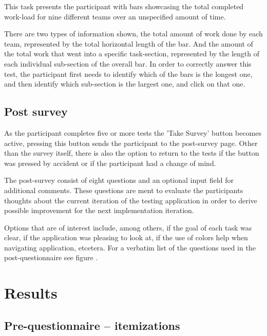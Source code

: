 \documentclass[nofilelist,dvipsnames]{cslthse-msc}
\begin{document}
{        This task presents the participant with bars showcasing the total
        completed work-load for nine different teams over an unspecified amount
        of time.

        There are two types of information shown, the total amount of work done
        by each team, represented by the total horizontal length of the bar.
        And the amount of the total work that went into a specific
        task-section, represented by the length of each individual sub-section
        of the overall bar.
        In order to correctly answer this test, the participant first needs to
        identify which of the bars is the longest one, and then identify which
        sub-section is the largest one, and click on that one.

      \subsection{Post survey}

        As the participant completes five or more tests the 'Take Survey'
        button becomes active, pressing this button sends the participant to
        the post-survey page. Other than the survey itself, there is also the
        option to return to the tests if the button was pressed by accident or
        if the participant had a change of mind.

        The post-survey consist of eight questions and an optional input field
        for additional comments. These questions are ment to evaluate the
        participants thoughts about the current iteration of the testing
        application in order to derive possible improvement for the next
        implementation iteration.

        Options that are of interest include, among others, if the goal of each
        task was clear, if the application was pleasing to look at, if the use of
        colors help when navigating application, etcetera. For a verbatim list of
        the questions used in the post-questionnaire see figure
        .

		\section{Results}

			\subsection{Pre-questionnaire -- itemizations}

}
\end{document}
